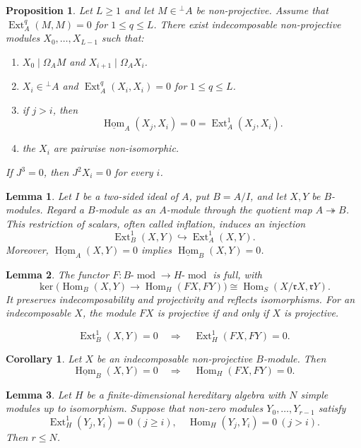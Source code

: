 \documentclass[10pt,a4paper]{amsart}
\newtheorem{proposition}{Proposition}
\newtheorem{lemma}{Lemma}
\newtheorem{corollary}{Corollary}
\newcommand{\Ext}{\operatorname{Ext}}
\newcommand{\Hom}{\operatorname{Hom}}
\newcommand{\modu}{\operatorname{mod}}
\newcommand{\perpA}{{}^{\perp}\!A}
\newcommand{\stableHom}{\underline{\Hom}}
\begin{document}
\begin{proposition}\label{prop:chain}
Let $L\ge1$ and let $M\in\perpA$ be non-projective. Assume that
$\Ext_A^q(M,M)=0$ for $1\le q\le L$. There exist indecomposable
non-projective modules $X_0,\ldots,X_{L-1}$ such that:
\begin{enumerate}[label=\textnormal{(\roman*)},leftmargin=2.2em]
 \item {$X_0\mid\Omega_A M$ and $X_{i+1}\mid\Omega_A X_i$.}
 \item {$X_i\in\perpA$ and $\Ext_A^q(X_i,X_i)=0$ for $1\le q\le L$.}
 \item if $j>i$, then
 \[
 \stableHom_A(X_j,X_i)=0=\Ext_A^1(X_j,X_i).
 \]
 \item the $X_i$ are pairwise non-isomorphic.
\end{enumerate}
If $J^3=0$, then $J^2X_i=0$ for every $i$.
\end{proposition}

\begin{lemma}\label{lem:quotient}
Let $I$ be a two-sided ideal of $A$, put $B=A/I$, and let $X,Y$ be
$B$-modules. Regard a $B$-module as an $A$-module through the quotient map
$A\twoheadrightarrow B$. This restriction of scalars, often called
inflation, induces an injection
\[
 \Ext_B^1(X,Y)\hookrightarrow\Ext_A^1(X,Y).
\]
Moreover, $\stableHom_A(X,Y)=0$ implies
$\stableHom_B(X,Y)=0$.
\end{lemma}

\begin{lemma}\label{lem:F}
The functor $F:B\text{-}\modu\to H\text{-}\modu$ is full, with
\[
 \ker\bigl(\Hom_B(X,Y)\longrightarrow\Hom_H(FX,FY)\bigr)
 \cong\Hom_S(X/\mathfrak rX,\mathfrak rY).
\]
It preserves indecomposability and projectivity and reflects
isomorphisms. For an indecomposable $X$, the module $FX$ is
projective if and only if $X$ is projective.
\end{lemma}

\begin{equation}\label{eq:ext-implication}
 \Ext_B^1(X,Y)=0\quad\Longrightarrow\quad\Ext_H^1(FX,FY)=0.
\end{equation}

\begin{corollary}\label{cor:hom-transfer}
Let $X$ be an indecomposable non-projective $B$-module. Then
\[
 \stableHom_B(X,Y)=0\quad\Longrightarrow\quad\Hom_H(FX,FY)=0.
\]
\end{corollary}

\begin{lemma}\label{lem:rank}
Let $H$ be a finite-dimensional hereditary algebra with $N$ simple
modules up to isomorphism. Suppose that non-zero modules
$Y_0,\ldots,Y_{r-1}$ satisfy
\[
 \Ext_H^1(Y_j,Y_i)=0~(j\ge i),
 \quad\Hom_H(Y_j,Y_i)=0~(j>i).
\]
Then $r\le N$.
\end{lemma}
\end{document}

